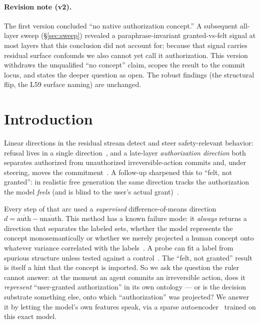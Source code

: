 \documentclass[11pt]{article}
\begin{document}
\paragraph{Revision note (v2).} The first version concluded ``no native authorization concept.'' A subsequent all-layer sweep (\S\ref{sec:sweep}) revealed a paraphrase-invariant granted-vs-felt signal at most layers that this conclusion did not account for; because that signal carries residual surface confounds we also cannot yet call it authorization. This version withdraws the unqualified ``no concept'' claim, scopes the result to the commit locus, and states the deeper question as open. The robust findings (the structural flip, the L59 surface naming) are unchanged.

\section{Introduction}
Linear directions in the residual stream detect and steer safety-relevant behavior: refusal lives in a
single direction~\cite{refusaldir}, and a late-layer \emph{authorization direction} both separates authorized
from unauthorized irreversible-action commits and, under steering, moves the commitment~\cite{authdir}. A
follow-up sharpened this to ``felt, not granted'': in realistic free generation the same direction tracks the
authorization the model \emph{feels} (and is blind to the user's actual grant)~\cite{feltnotgranted}.

Every step of that arc used a \emph{supervised} difference-of-means direction $d=\overline{\text{auth}}
-\overline{\text{unauth}}$. This method has a known failure mode: it \emph{always} returns a direction that
separates the labeled sets, whether the model represents the concept monosemantically or whether we merely
projected a human concept onto whatever variance correlated with the labels~\cite{geometry,interpillusion}. A probe can fit a label from spurious structure unless tested against a control~\cite{controltasks}.
The ``felt, not granted'' result is itself a hint that the concept is imported. So we ask the question the
ruler cannot answer: at the moment an agent commits an irreversible action, does it \emph{represent}
``user-granted authorization'' in its own ontology --- or is the decision substrate something else, onto which
``authorization'' was projected? We answer it by letting the model's own features speak, via a sparse
autoencoder~\cite{monosemantic,saefind,topk,scalingmono} trained on this exact model.
\end{document}
